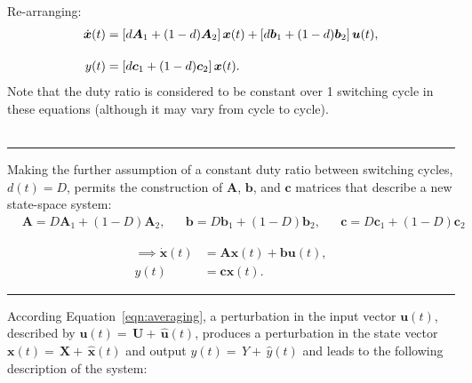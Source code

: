 Re-arranging:
\begin{align*}
\dot{\boldsymbol{x}}(t)
&= \left[d \boldsymbol{A}_1 + (1 - d) \boldsymbol{A}_2\right]\boldsymbol{x}(t)
+ \left[d \boldsymbol{b}_1 + (1 - d) \boldsymbol{b}_2\right]\boldsymbol{u}(t),
\\[11pt]
y(t) &= \left[d\boldsymbol{c}_1 + (1 - d) \boldsymbol{c}_2\right] \boldsymbol{x}(t).
\end{align*}
Note that the duty ratio is considered to be constant over 1 switching cycle in these equations (although it may vary from cycle to cycle).
~\\
~\rule{\textwidth}{0.5pt}
Making the further assumption of a constant duty ratio between switching cycles, $d(t) = D$, permits the construction of $\boldsymbol{A}$, $\boldsymbol{b}$, and $\boldsymbol{c}$ matrices that describe a new state-space system:
\begin{align}
&
\boldsymbol{A} = D \boldsymbol{A}_1 + (1 - D) \boldsymbol{A}_2,
&&
\boldsymbol{b} = D \boldsymbol{b}_1 + (1 - D) \boldsymbol{b}_2,
&&
\boldsymbol{c} = D \boldsymbol{c}_1 + (1 - D) \boldsymbol{c}_2
\label{eqn:matrices_steadystate}
\end{align}
\begin{comment}
\begin{itemize}
\item $\boldsymbol{A} = D \boldsymbol{A}_1 + (1 - D) \boldsymbol{A}_2$
\item $\boldsymbol{b} = D \boldsymbol{b}_1 + (1 - D) \boldsymbol{b}_2$
\item $\boldsymbol{c} = D \boldsymbol{c}_1 + (1 - D) \boldsymbol{c}_2$
\end{itemize}
\end{comment}
\begin{align}
\implies
\dot{\boldsymbol{x}}(t)
&= \boldsymbol{A} \boldsymbol{x}(t) + \boldsymbol{b} \boldsymbol{u}(t), \nonumber
\\[11pt]
y(t) &= \boldsymbol{c} \boldsymbol{x}(t). \label{eqn:averaging}
\end{align}
\rule{\textwidth}{0.5pt}
According Equation~\ref{eqn:averaging}, a perturbation in the input vector $\boldsymbol{u}(t)$, described by $\boldsymbol{u}(t) = \, \boldsymbol{U} + \, \hat{\boldsymbol{u}}(t)$, produces a perturbation in the state vector $\boldsymbol{x}(t) = \, \boldsymbol{X} + \, \hat{\boldsymbol{x}}(t)$ and output $y(t) = \, Y + \, \hat{y}(t)$ and leads to the following description of the system:
